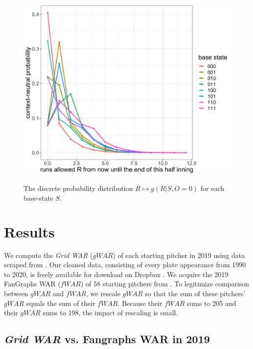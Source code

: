 \documentclass[12pt]{article}
\begin{document}
\begin{figure}[t!]
\centering
\caption{The discrete probability distribution $R \mapsto g(R|S,O=0)$ for each base-state $S$.} 
\includegraphics[width=15cm]{../writeup_plots/plot_gRSO_R0.png}
\label{fig:g0}
\end{figure}


\section{Results}

We compute the \textit{Grid WAR} ($gWAR$) of each starting pitcher in 2019 using data scraped from \citet{retroRaw}. Our cleaned data, consisting of every plate appearance from 1990 to 2020, is freely available for download on Dropbox \citep{dropboxRetrosheet}. We acquire the 2019 FanGraphs WAR ($fWAR$) of 58 starting pitchers from \citet{Fangraphs2019War}. To legitimize comparison between $gWAR$ and $fWAR$, we rescale $gWAR$ so that the sum of these pitchers' $gWAR$ equals the sum of their $fWAR$. Because their $fWAR$ sums to 205 and their $gWAR$ sums to 198, the impact of rescaling is small. 

\subsection{\textit{Grid WAR} vs. Fangraphs WAR in 2019}
\end{document}
